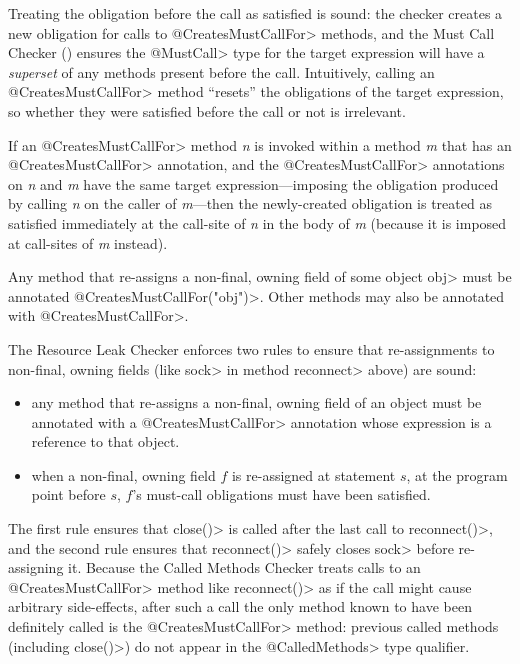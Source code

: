 Treating the obligation before the call as satisfied is sound: the
checker creates a new obligation for calls to \<@CreatesMustCallFor> methods,
and the Must Call Checker () ensures the
\<@MustCall> type for the target expression will have a \emph{superset} of any methods
present before the call. Intuitively, calling an \<@CreatesMustCallFor> method
``resets'' the obligations of the target expression, so whether they were satisfied before
the call or not is irrelevant.

If an \<@CreatesMustCallFor>
method \emph{n} is invoked within a method \emph{m} that has an \<@CreatesMustCallFor> annotation,
and the \<@CreatesMustCallFor> annotations on \emph{n} and \emph{m} have
the same target expression---imposing the obligation produced by calling \emph{n} on the caller of \emph{m}---then
the newly-created obligation is treated as satisfied immediately
at the call-site of \emph{n} in the body of \emph{m} (because it is imposed at call-sites of \emph{m}
instead).



Any method that re-assigns a non-final, owning field of some object \<obj>
must be annotated \<@CreatesMustCallFor("obj")>.
Other methods may also be annotated with \<@CreatesMustCallFor>.

The Resource Leak Checker enforces two rules to ensure that re-assignments
to non-final, owning fields (like \<sock> in method \<reconnect> above) are
sound:
\begin{itemize}
\item any method that re-assigns a non-final, owning field of an object
  must be annotated with a \<@CreatesMustCallFor> annotation
  whose expression is a reference to that object.
\item when a non-final, owning field $f$ is re-assigned at statement $s$,
  at the program point before $s$, $f$'s must-call obligations must have been satisfied.
\end{itemize}
\noindent
The first rule ensures that \<close()> is called after the last call
to \<reconnect()>, and the second rule ensures that \<reconnect()>
safely closes \<sock> before re-assigning it. Because the Called Methods Checker
treats calls to an \<@CreatesMustCallFor> method like \<reconnect()> as if the call might
cause arbitrary side-effects, after such a call the only method known to have been
definitely called is the \<@CreatesMustCallFor> method: previous called
methods (including \<close()>) do not appear in the \<@CalledMethods> type qualifier.

